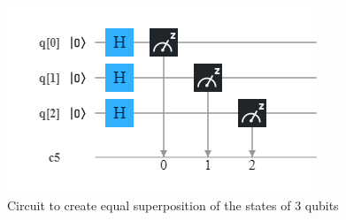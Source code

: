 \documentclass[english,a4paper,11pt,oneside,onecolumn]{book}
\begin{document}
\begin{figure}[H]
    \centering
    \includegraphics[scale=0.7]{Images/Quantum Superposition.png}
    \caption{Circuit to create equal superposition of the states of 3 qubits}
    \label{fig:qSupPos}
\end{figure}
\end{document}
